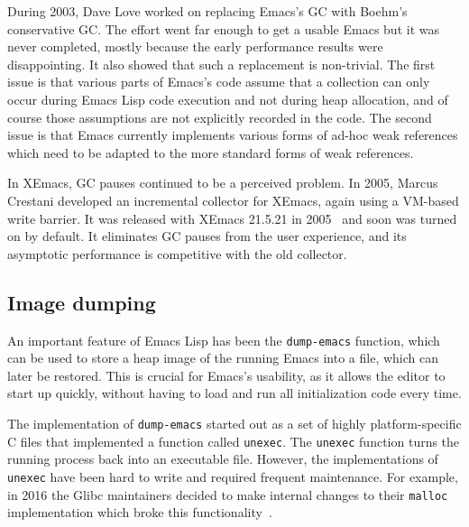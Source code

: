 \documentclass[format=acmsmall, review]{acmart}
\newcommand \Elisp {Emacs Lisp}
\begin{document}
During 2003, Dave Love worked on replacing Emacs's GC with Boehm's
conservative GC.  The effort went far enough to get a usable Emacs but it
was never completed, mostly because the early performance results were
disappointing.  It also showed that such a replacement is non-trivial.
The first issue is that various parts of Emacs's code assume that
a collection can only occur during \Elisp{} code execution and not during
heap allocation, and of course those assumptions are not explicitly recorded
in the code.  The second issue is that Emacs currently implements various
forms of ad-hoc weak references which need to be adapted to the more
standard forms of weak references.

\label{sec:incremental-gc}
In XEmacs, GC pauses continued to be a perceived problem.  In 2005, Marcus
Crestani developed an incremental collector for XEmacs, again using
a VM-based write barrier.  It was released with XEmacs 21.5.21 in
2005~\cite{Crestani2005} and soon was turned on by default.  It
eliminates GC pauses from the user experience, and its asymptotic
performance is competitive with the old collector.

\subsection{Image dumping}
\label{sec:image-dumping}

An important feature of \Elisp{} has been the \texttt{dump-emacs}
function, which can be used to store a heap image of the running Emacs
into a file, which can later be restored.  This is crucial for Emacs's
usability, as it allows the editor to start up quickly, without
having to load and run all initialization code every time.

The implementation of \texttt{dump-emacs} started out as a set of highly
platform-specific C files that implemented a function called
\texttt{unexec}.  The \texttt{unexec} function turns the running process
back into an executable file.  However, the implementations of
\texttt{unexec} have been hard to write and required frequent maintenance.
For example, in 2016 the Glibc maintainers decided to make internal changes
to their \texttt{malloc} implementation which broke this functionality~\cite{UnexecGlibc}.
\end{document}
